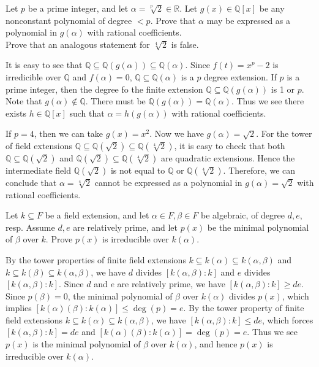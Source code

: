 \begin{problem}[1.20]
Let $p$ be a prime integer, and let $\alpha=\sqrt[p]{2} \in \mathbb{R}$. Let $g(x) \in \mathbb{Q}[x]$ be any nonconstant polynomial of degree $<p$. Prove that $\alpha$ may be expressed as a polynomial in $g(\alpha)$ with rational coefficients.\\
Prove that an analogous statement for $\sqrt[4]{2}$ is false.
\end{problem}
\begin{solution}
It is easy to see that $\mathbb{Q}\subseteq \mathbb{Q}(g(\alpha)) \subseteq\mathbb{Q}(\alpha)$. Since $f(t)=x^p-2$ is irredicible over $\mathbb{Q}$ and $f(\alpha)=0$, $\mathbb{Q}\subseteq \mathbb{Q}(\alpha)$ is a $p$ degree extension. If $p$ is a prime integer, then the degree fo the finite extension $\mathbb{Q}\subseteq \mathbb{Q}(g(\alpha))$ is 1 or $p$. Note that $g(\alpha)\notin \mathbb{Q}$. There must be $\mathbb{Q}(g(\alpha))=\mathbb{Q}(\alpha)$. Thus we see there exists $h\in \mathbb{Q}[x]$ such that $\alpha = h(g(\alpha))$ with rational coefficients.

If $p=4$, then we can take $g(x)=x^2$. Now we have $g(\alpha)=\sqrt{2}$. For the tower of field extensions $\mathbb{Q}\subseteq \mathbb{Q}(\sqrt{2}) \subseteq\mathbb{Q}(\sqrt[4]{2})$, it is easy to check that both $\mathbb{Q}\subseteq \mathbb{Q}(\sqrt{2}) $ and $ \mathbb{Q}(\sqrt{2}) \subseteq\mathbb{Q}(\sqrt[4]{2})$ are quadratic extensions. Hence the intermediate field $ \mathbb{Q}(\sqrt{2})$ is not equal to $\mathbb{Q}$ or $\mathbb{Q}(\sqrt[4]{2})$. Therefore, we can conclude that $\alpha=\sqrt[4]{2}$ cannot be expressed as a polynomial in $g(\alpha)=\sqrt{2}$ with rational coefficients.
\end{solution}


\begin{problem}[1.22]
	 Let $k \subseteq F$ be a field extension, and let $\alpha \in F, \beta \in F$ be algebraic, of degree $d, e$, resp. Assume $d, e$ are relatively prime, and let $p(x)$ be the minimal polynomial of $\beta$ over $k$. Prove $p(x)$ is irreducible over $k(\alpha)$.
	\end{problem}
\begin{solution}
	By the tower properties of finite field extensions $k \subseteq k(\alpha) \subseteq k(\alpha,\beta)$ and  $k \subseteq k(\beta) \subseteq k(\alpha,\beta)$, we have $d$ divides $[k(\alpha,\beta): k]$ and $e$ divides $[k(\alpha,\beta): k]$. Since $d$ and $e$ are relatively prime, we have $[k(\alpha,\beta): k]\ge de$. Since $p(\beta)=0$, the minimal polynomial of $\beta$ over $k(\alpha)$ divides $p(x)$, which implies $ [k(\alpha)(\beta): k(\alpha)]\le \deg(p)=e$. By the tower property of finite field extensions $k \subseteq k(\alpha) \subseteq k(\alpha,\beta)$, we have $[k(\alpha,\beta): k]\le de$, which forces $[k(\alpha,\beta): k]= de$ and $[k(\alpha)(\beta): k(\alpha)]=\deg(p)=e$. Thus we see $p(x)$ is the minimal polynomial of $\beta$ over $k(\alpha)$, and hence $p(x)$ is irreducible over $k(\alpha)$.
\end{solution}

